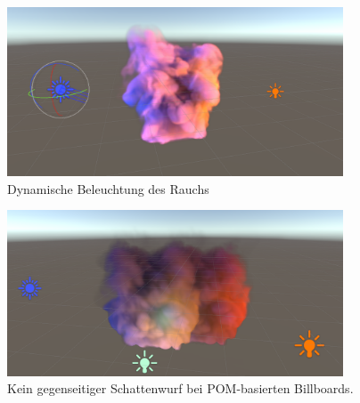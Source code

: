 \begin{figure}[h!]
	\centering
	\includegraphics[width=0.89\textwidth]{Grafiken/Implementation/litSmoke.png}
	\begin{footnotesize}
		\caption{Dynamische Beleuchtung des Rauchs}
		\label{fig:dynamicLightingSmoke}
	\end{footnotesize}
\end{figure}



\begin{figure}[h!]
	\centering
	\includegraphics[width=0.89\textwidth]{Grafiken/Evaluation/pomShadows.png}
	\begin{footnotesize}
		\caption{Kein gegenseitiger Schattenwurf bei POM-basierten Billboards. }
		\label{fig:pomShadows}
	\end{footnotesize}
\end{figure}





